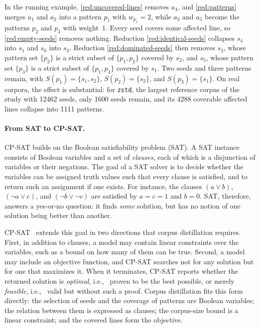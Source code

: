 In the running example, \ref{red:uncovered-lines} removes $a_4$, and \ref{red:patterns} merges $a_1$ and $a_2$ into a pattern $p_1$ with $w_{p_1}=2$, while $a_3$ and $a_5$ become the patterns $p_2$ and $p_3$ with weight~$1$.
Every seed covers some affected line, so \ref{red:empty-seeds} removes nothing.
Reduction \ref{red:identical-seeds} collapses $s_4$ into $s_1$ and $s_6$ into $s_3$.
Reduction \ref{red:dominated-seeds} then removes $s_3$, whose pattern set $\{p_2\}$ is a strict subset of $\{p_1, p_2\}$ covered by $s_2$, and $s_5$, whose pattern set $\{p_3\}$ is a strict subset of $\{p_1, p_3\}$ covered by $s_1$.
Two seeds and three patterns remain, with $S(p_1)=\{s_1, s_2\}$, $S(p_2)=\{s_2\}$, and $S(p_3)=\{s_1\}$.
On real corpora, the effect is substantial: for \texttt{zstd}, the largest reference corpus of the study with \num{12462} seeds, only \num{1600} seeds remain, and its \num{4288} coverable affected lines collapse into \num{1111} patterns.

\paragraph{From SAT to CP-SAT.}
CP-SAT builds on the Boolean satisfiability problem (SAT).
A SAT instance consists of Boolean variables and a set of \emph{clauses}, each of which is a disjunction of variables or their negations.
The goal of a SAT solver is to decide whether the variables can be assigned truth values such that every clause is satisfied, and to return such an assignment if one exists.
For instance, the clauses $(a \lor b)$, $(\lnot a \lor c)$, and $(\lnot b \lor \lnot c)$ are satisfied by $a=c=1$ and $b=0$.
SAT, therefore, answers a yes-or-no question: it finds \emph{some} solution, but has no notion of one solution being better than another.

CP-SAT~\cite{cpsatlp} extends this goal in two directions that corpus distillation requires.
First, in addition to clauses, a model may contain linear constraints over the variables, such as a bound on how many of them can be true.
Second, a model may include an objective function, and CP-SAT searches not for any solution but for one that maximizes it.
When it terminates, CP-SAT reports whether the returned solution is \emph{optimal}, i.e., \ proven to be the best possible, or merely \emph{feasible}, i.e., \ valid but without such a proof.
Corpus distillation fits this form directly: the selection of seeds and the coverage of patterns are Boolean variables; the relation between them is expressed as clauses; the corpus-size bound is a linear constraint; and the covered lines form the objective.


